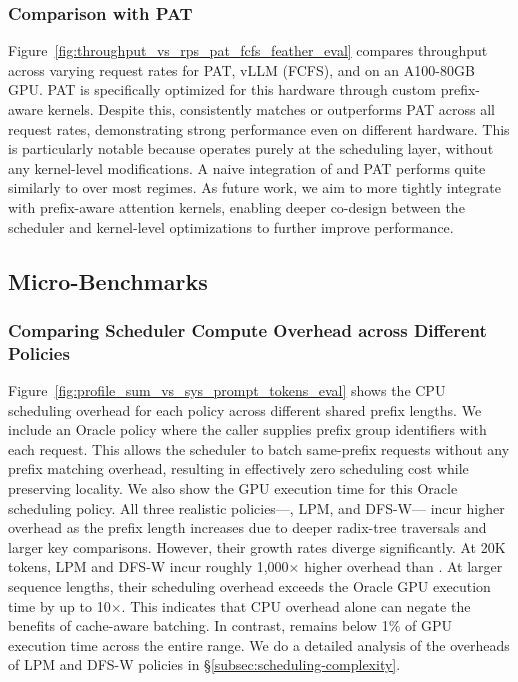 \vspace{-5pt}

\subsubsection*{Comparison with PAT}
Figure~\ref{fig:throughput_vs_rps_pat_fcfs_feather_eval} compares throughput across varying request rates for PAT, vLLM (FCFS), and \Feather on an A100-80GB GPU. PAT is specifically optimized for this hardware through custom prefix-aware kernels. Despite this, \Feather consistently matches or outperforms PAT across all request rates, demonstrating strong performance even on different hardware. This is particularly notable because \Feather operates purely at the scheduling layer, without any kernel-level modifications. A naive integration of \Feather and PAT performs quite similarly to \Feather over most regimes. As future work, we aim to more tightly integrate \Feather with prefix-aware attention kernels, enabling deeper co-design between the scheduler and kernel-level optimizations to further improve performance.

\vspace{-5pt}

\subsection{Micro-Benchmarks}
\subsubsection*{Comparing Scheduler Compute Overhead across Different Policies}
Figure~\ref{fig:profile_sum_vs_sys_prompt_tokens_eval} shows the CPU scheduling overhead for each policy across different shared prefix lengths. We include an Oracle policy where the caller supplies prefix group identifiers with each request. This allows the scheduler to batch same-prefix requests without any prefix matching overhead, resulting in effectively zero scheduling cost while preserving locality. We also show the GPU execution time for this Oracle scheduling policy. All three realistic policies—\Feather, LPM, and DFS-W— incur higher overhead as the prefix length increases due to deeper radix-tree traversals and larger key comparisons. However, their growth rates diverge significantly. At 20K tokens, LPM and DFS-W incur roughly 1,000$\times$ higher overhead than \Feather. At larger sequence lengths, their scheduling overhead exceeds the Oracle GPU execution time by up to 10$\times$. This indicates that CPU overhead alone can negate the benefits of cache-aware batching. In contrast, \Feather remains below 1\% of GPU execution time across the entire range. We do a detailed analysis of the overheads of LPM and DFS-W policies in \S\ref{subsec:scheduling-complexity}.

